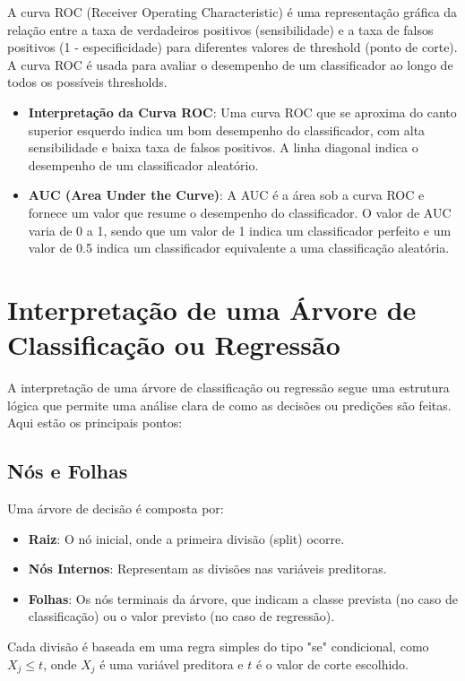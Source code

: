 \documentclass{sciposter}
\begin{document}
\begin{multicols}{3}
A curva ROC (Receiver Operating Characteristic) é uma representação gráfica da relação entre a taxa de verdadeiros positivos (sensibilidade) e a taxa de falsos positivos (1 - especificidade) para diferentes valores de threshold (ponto de corte). A curva ROC é usada para avaliar o desempenho de um classificador ao longo de todos os possíveis thresholds.

\begin{itemize}
    \item \textbf{Interpretação da Curva ROC}: Uma curva ROC que se aproxima do canto superior esquerdo indica um bom desempenho do classificador, com alta sensibilidade e baixa taxa de falsos positivos. A linha diagonal indica o desempenho de um classificador aleatório.
    
    \item \textbf{AUC (Area Under the Curve)}: A AUC é a área sob a curva ROC e fornece um valor que resume o desempenho do classificador. O valor de AUC varia de 0 a 1, sendo que um valor de 1 indica um classificador perfeito e um valor de 0.5 indica um classificador equivalente a uma classificação aleatória.
\end{itemize}

\section{Interpretação de uma Árvore de Classificação ou Regressão}

A interpretação de uma árvore de classificação ou regressão segue uma estrutura lógica que permite uma análise clara de como as decisões ou predições são feitas. Aqui estão os principais pontos:

\subsection{Nós e Folhas}
Uma árvore de decisão é composta por:
\begin{itemize}
    \item \textbf{Raiz}: O nó inicial, onde a primeira divisão (split) ocorre.
    \item \textbf{Nós Internos}: Representam as divisões nas variáveis preditoras.
    \item \textbf{Folhas}: Os nós terminais da árvore, que indicam a classe prevista (no caso de classificação) ou o valor previsto (no caso de regressão).
\end{itemize}

Cada divisão é baseada em uma regra simples do tipo "se" condicional, como \( X_j \leq t \), onde \(X_j\) é uma variável preditora e \(t\) é o valor de corte escolhido.


\end{multicols}
\end{document}
